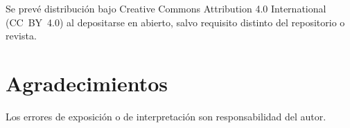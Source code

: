 \documentclass[11pt,a4paper]{article}
\begin{document}
Se prev\'e distribuci\'on bajo Creative Commons Attribution 4.0 International
(CC~BY~4.0) al depositarse en abierto, salvo requisito distinto del
repositorio o revista.

\section*{Agradecimientos}

Los errores de exposici\'on o de interpretaci\'on son responsabilidad del
autor.



\end{document}
